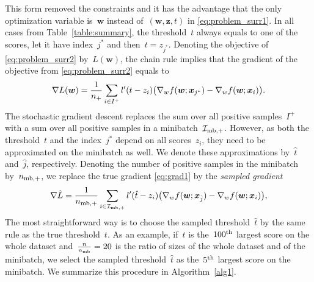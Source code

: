 This form removed the constraints and it has the advantage that the only optimization variable is~$\bm{w}$ instead of~$(\bm{w}, \bm{z}, t)$ in \eqref{eq:problem_surr1}. In all cases from Table~\ref{table:summary}, the threshold~$t$ always equals to one of the scores, let it have index~$j^*$ and then~$t=z_{j^*}$. Denoting the objective of \eqref{eq:problem_surr2} by~$L(\bm{w})$, the chain rule implies that the gradient of the objective from \eqref{eq:problem_surr2} equals to
\begin{equation}\label{eq:grad1}
  \nabla L(\bm{w}) = \frac{1}{n_{+}} \sum_{i\in I^+}l'(t-z_i)\big(\nabla_w f(\bm{w};\bm{x}_{j^*}) - \nabla_w f(\bm{w};\bm{x}_i)\big).
\end{equation}
The stochastic gradient descent replaces the sum over all positive samples~$I^+$ with a sum over all positive samples in a minibatch~$\mathcal{I}_{\text{mb},+}$. However, as both the threshold~$t$ and the index~$j^*$ depend on all scores~$z_i$, they need to be approximated on the minibatch as well. We denote these approximations by~$\hat t$ and~$\hat j$, respectively. Denoting the number of positive samples in the minibatch by~$n_{\text{mb},+}$, we replace the true gradient \eqref{eq:grad1} by the \textit{sampled gradient}
\begin{equation}\label{eq:grad2}
  \nabla \hat L = \frac{1}{n_{\text{mb},+}}\sum_{i\in \mathcal{I}_{\text{mb},+}}l'(\hat t-z_i)\big(\nabla_w f(\bm{w};\bm{x}_{\hat j}) - \nabla_w f(\bm{w};\bm{x}_i) \big),
\end{equation}
The most straightforward way is to choose the sampled threshold~$\hat t$ by the same rule as the true threshold~$t$. As an example, if~$t$ is the~$100^{\rm th}$ largest score on the whole dataset and~$\frac{n}{n_{\text{mb}}}=20$ is the ratio of sizes of the whole dataset and of the minibatch, we select the sampled threshold~$\hat t$ as the~$5^{\rm th}$ largest score on the minibatch. We summarize this procedure in Algorithm~\ref{alg1}.

